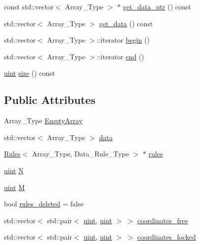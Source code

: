 \textbf{ }\par
\begin{DoxyCompactItemize}
\item 
const std\+::vector$<$ Array\+\_\+\+Type $>$ $\ast$ \hyperlink{classbarry_1_1_power_set_a80b283b1ac115f1be049a09f1a69586a}{get\+\_\+data\+\_\+ptr} () const
\item 
std\+::vector$<$ Array\+\_\+\+Type $>$ \hyperlink{classbarry_1_1_power_set_a53ca37c9cb14abd6f61bc0127ac9d067}{get\+\_\+data} () const
\item 
std\+::vector$<$ Array\+\_\+\+Type $>$\+::iterator \hyperlink{classbarry_1_1_power_set_a0db34800ac228a47917cc9f3e08a88a9}{begin} ()
\item 
std\+::vector$<$ Array\+\_\+\+Type $>$\+::iterator \hyperlink{classbarry_1_1_power_set_a1fb01ffc52e39a831058c480e981da9e}{end} ()
\item 
\hyperlink{namespacebarry_a11dfc53ddb4672278319aa04f1e09a6c}{uint} \hyperlink{classbarry_1_1_power_set_af8b336d7b958c44bb69cd24d7a462ed8}{size} () const
\end{DoxyCompactItemize}

\subsection*{Public Attributes}
\begin{DoxyCompactItemize}
\item 
Array\+\_\+\+Type \hyperlink{classbarry_1_1_power_set_a7709618ce9c3d9346499c7b23b91392a}{Empty\+Array}
\item 
std\+::vector$<$ Array\+\_\+\+Type $>$ \hyperlink{classbarry_1_1_power_set_a90fecd17a9d1f36153c07bc929b1630f}{data}
\item 
\hyperlink{classbarry_1_1_rules}{Rules}$<$ Array\+\_\+\+Type, Data\+\_\+\+Rule\+\_\+\+Type $>$ $\ast$ \hyperlink{classbarry_1_1_power_set_ae8eee09092e96fbefde320ba89fdcbfc}{rules}
\item 
\hyperlink{namespacebarry_a11dfc53ddb4672278319aa04f1e09a6c}{uint} \hyperlink{classbarry_1_1_power_set_adea0f6434b17b3fc391475a11db00c2f}{N}
\item 
\hyperlink{namespacebarry_a11dfc53ddb4672278319aa04f1e09a6c}{uint} \hyperlink{classbarry_1_1_power_set_ae64182a21f9969a2c9fdf73ab23a6c5e}{M}
\item 
bool \hyperlink{classbarry_1_1_power_set_aac868bcdb4a7f6c17d35aa29cf8e5028}{rules\+\_\+deleted} = false
\item 
std\+::vector$<$ std\+::pair$<$ \hyperlink{namespacebarry_a11dfc53ddb4672278319aa04f1e09a6c}{uint}, \hyperlink{namespacebarry_a11dfc53ddb4672278319aa04f1e09a6c}{uint} $>$ $>$ \hyperlink{classbarry_1_1_power_set_a2bc42422f23546d55fef96f053c0c4ea}{coordinates\+\_\+free}
\item 
std\+::vector$<$ std\+::pair$<$ \hyperlink{namespacebarry_a11dfc53ddb4672278319aa04f1e09a6c}{uint}, \hyperlink{namespacebarry_a11dfc53ddb4672278319aa04f1e09a6c}{uint} $>$ $>$ \hyperlink{classbarry_1_1_power_set_a46fa867445a84be388ee62602922980a}{coordinates\+\_\+locked}
\end{DoxyCompactItemize}


